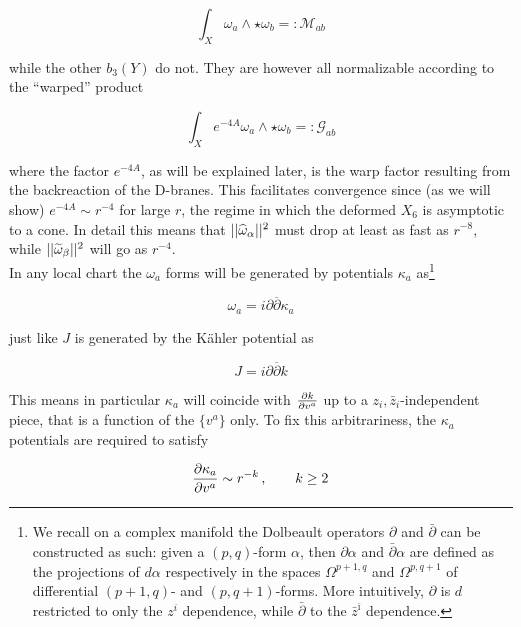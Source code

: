 \begin{equation}
	\int_X \omega_a \wedge \star \omega_b =: \mathcal{M}_{ab} \label{defM}
\end{equation}

while the other $b_3(Y)$ do not. They are however all normalizable according to the ``warped'' product

\begin{equation}
	\int_X e^{-4A} \omega_a \wedge \star \omega_b =: \mathcal{G}_{ab} \label{defG}
\end{equation}

where the factor $e^{-4A}$, as will be explained later, is the warp factor resulting from the backreaction of the D-branes. This facilitates convergence since (as we will show) $e^{-4A} \sim r^{-4}$ for large $r$, the regime in which the deformed $X_6$ is asymptotic to a cone. In detail this means that $||\widehat{\omega}_\alpha||^2$ must drop at least as fast as $r^{-8}$, while $||\widetilde{\omega}_\beta||^2$ will go as $r^{-4}$.\\

In any local chart the $\omega_a$ forms will be generated by potentials $\kappa_a$ as\footnote{We recall on a complex manifold the Dolbeault operators $\partial$ and $\bar\partial$ can be constructed as such: given a $(p,q)$-form $\alpha$, then $\partial\alpha$ and $\bar\partial\alpha$ are defined as the projections of $d\alpha$ respectively in the spaces $\Omega^{p+1,q}$ and $\Omega^{p,q+1}$ of differential $(p+1,q)$- and $(p,q+1)$-forms. More intuitively, $\partial$ is $d$ restricted to only the $z^i$ dependence, while $\bar\partial$ to the $\bar z^{\bar\imath}$ dependence.} 

\begin{equation}
	\omega_a = i \partial \overline \partial \kappa_a 
	\label{omegafromk}
\end{equation}

just like $J$ is generated by the K\"ahler potential as 

\begin{equation}\label{jfromk}
J = i \partial \overline \partial k
\end{equation}

This means in particular $\kappa_a$ will coincide with $\frac{\partial k}{\partial v^a}$ up to a $z_i, \bar z_i$-independent piece, that is a function of the $\{v^a\}$ only. To fix this arbitrariness, the $\kappa_a$ potentials are required to satisfy

\begin{equation}
	\frac{\partial\kappa_a}{\partial v^a} \sim r^{-k}\,, \quad \quad k \geq 2
	\label{asycond}
\end{equation}

